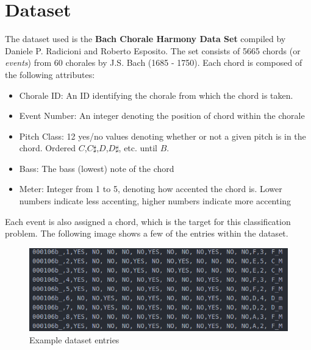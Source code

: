 \documentclass[a4paper]{article}
\begin{document}
\section{Dataset}
The dataset used is the \textbf{Bach Chorale Harmony Data Set} compiled by Daniele P. Radicioni and Roberto Esposito. The set consists of 5665 chords (or \textit{events}) from 60 chorales by J.S. Bach (1685 - 1750). Each chord is composed of the following attributes:
\begin{itemize}
\item Chorale ID: An ID identifying the chorale from which the chord is taken.
\item Event Number: An integer denoting the position of chord within the chorale
\item Pitch Class: 12 yes/no values denoting whether or not a given pitch is in the chord. Ordered $C$,$C\sharp$,$D$,$D\sharp$, etc. until $B$.
\item Bass: The bass (lowest) note of the chord
\item Meter: Integer from 1 to 5, denoting how accented the chord is. Lower numbers indicate less accenting, higher numbers indicate more accenting
\end{itemize}
Each event is also assigned a chord, which is the target for this classification problem. The following image shows a few of the entries within the dataset.
\begin{figure}[h]
\includegraphics[scale=0.5]{BachChoraleDatasetExample.png}
\caption{Example dataset entries}
\end{figure}
\end{document}
